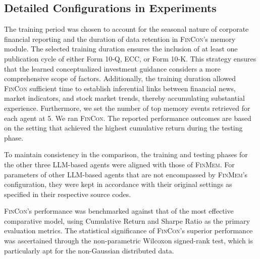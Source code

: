 \subsection{Detailed Configurations in Experiments}
\label{app:exp_figure}
The training period was chosen to account for the seasonal nature of corporate financial reporting and the duration of data retention in \textsc{FinCon}'s memory module. The selected training duration ensures the inclusion of at least one publication cycle of either Form 10-Q, ECC, or Form 10-K. This strategy ensures that the learned conceptualized investment guidance considers a more comprehensive scope of factors. Additionally, the training duration allowed \textsc{FinCon} sufficient time to establish inferential links between financial news, market indicators, and stock market trends, thereby accumulating substantial experience. Furthermore, we set the number of top memory events retrieved for each agent at 5. We ran \textsc{FinCon}. The reported performance outcomes are based on the setting that achieved the highest cumulative return during the testing phase.



To maintain consistency in the comparison, the training and testing phases for the other three LLM-based agents were aligned with those of \textsc{FinMem}. For parameters of other LLM-based agents that are not encompassed by \textsc{FinMem}'s configuration, they were kept in accordance with their original settings as specified in their respective source codes.





\textsc{FinCon}'s performance was benchmarked against that of the most effective comparative model, using Cumulative Return and Sharpe Ratio as the primary evaluation metrics. The statistical significance of \textsc{FinCon}'s superior performance was ascertained through the non-parametric Wilcoxon signed-rank test, which is particularly apt for the non-Gaussian distributed data.



